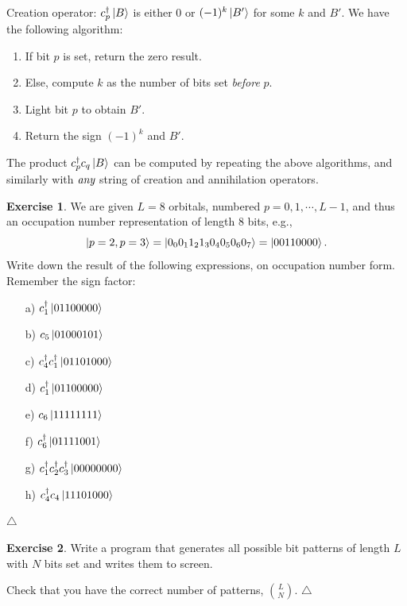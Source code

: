 \documentclass{report}
\theoremstyle{plain}
\theoremstyle{definition}
\newtheorem{exerc}{Exercise}[chapter]
\newcommand\xqed[1]{%
  \leavevmode\unskip\penalty9999 \hbox{}\nobreak\hfill
  \quad\hbox{#1}}
\newcommand\demo{\xqed{$\triangle$}}
\newenvironment{exercise}{\bigskip\begin{exerc}}{\demo\end{exerc}\bigskip}
\begin{document}
Creation operator:
$c^\dag_p \ket{B}$ is either $0$ or
$(-1)^k\ket{B'}$ for some $k$ and $B'$. We have the
following algorithm:
\begin{enumerate}
\item
  If bit $p$ is set, return the zero result.
\item
  Else, compute $k$ as the number of bits set \emph{before} $p$.
\item
  Light bit $p$ to obtain $B'$.
\item
  Return the sign $(-1)^k$ and $B'$.
\end{enumerate}


The product $c^\dag_p c_q \ket{B}$ can be computed by repeating the
above algorithms, and similarly with $\emph{any}$ string of creation
and annihilation operators.


\begin{exercise}
  We are given $L=8$ orbitals, numbered $p=0,1,\cdots,L-1$, and thus
  an occupation number representation of length $8$ bits, e.g.,
  \begin{equation}
    \ket{p=2,p=3} = \ket{0_0 0_1 1_2 1_3 0_4 0_5 0_6 0_7 } =
    \ket{00110000}.
  \end{equation}
  Write down the result of the following expressions, on occupation
  number form. Remember the sign factor:
  \begin{enumerate}
  \item[a)] $c^\dag_1         \ket{01100000}$
  \item[b)] $c_5             \ket{01000101}$
  \item[c)] $c^\dag_4 c^\dag_1 \ket{01101000}$
  \item[d)] $c^\dag_1         \ket{01100000}$
  \item[e)] $c_6             \ket{11111111}$
  \item[f)] $c^\dag_6         \ket{01111001}$
  \item[g)] $c^\dag_1 c^\dag_2 c^\dag_3  \ket{00000000}$
  \item[h)] $c^\dag_4c_4      \ket{11101000}$
  \end{enumerate}      
\end{exercise}


\begin{exercise}\label{ex:ci1}
  Write a program that generates all possible bit patterns of length
  $L$ with $N$ bits set and writes them to screen.

  Check that you have the correct number of patterns, $\binom{L}{N}$.
\end{exercise}
\end{document}
